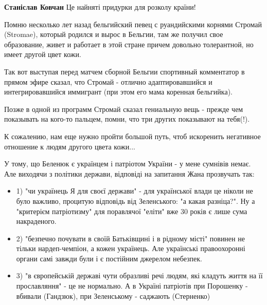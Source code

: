 \begin{itemize}
\begin{itemize}
\textbf{Станіслав Ковчан} Це найняті придурки для розколу країни!
\end{itemize}


Помню несколько лет назад бельгийский певец с руандийскими корнями Стромай
(Stromae), который родился и вырос в Бельгии, там же получил свое образование,
живет и работает в этой стране причем довольно толерантной, но имеет другой
цвет кожи. 

Так вот выступая перед матчем сборной Бельгии спортивный комментатор
в прямом эфире сказал, что Стромай - отлично адаптировавшийся и
интегрировавшийся иммигрант (при этом его мама коренная бельгийка). 

Позже в
одной из программ Стромай сказал гениальную вещь - прежде чем показывать на
кого-то пальцем, помни, что три других показывают на тебя(!).

К сожалению, нам еще нужно пройти большой путь, чтоб искоренить негативное
отношение к людям другого цвета кожи...


У тому, що Беленюк є українцем і патріотом України - у мене сумнівів немає. Але
виходячи з політики держави, відповіді на запитання Жана прозвучать так:

\begin{itemize}
\item 1) "чи українець Я для своєї держави" - для української влади це ніколи не було
важливо, процитую відповідь від Зеленського: "а какая разніца?". Ну а
"критерієм патріотизму" для поравлячої "еліти" вже 30 років є лише сума
накраденого.
\item 2) "безпечно почувати в своїй Батьківщині і в рідному місті" повинен не тільки
нардеп-чемпіон, а кожен українець. Але українські правоохоронні органи самі
завжди були і є постійним джерелом небезпек.

\item 3) "в європейській державі чути образливі речі людям, які кладуть життя на її
прославляння" - це не нормально. А в Україні патріотів при Порошенку - вбивали
(Гандзюк), при Зеленському - саджають (Стерненко)
\end{itemize}

 


\end{itemize}
